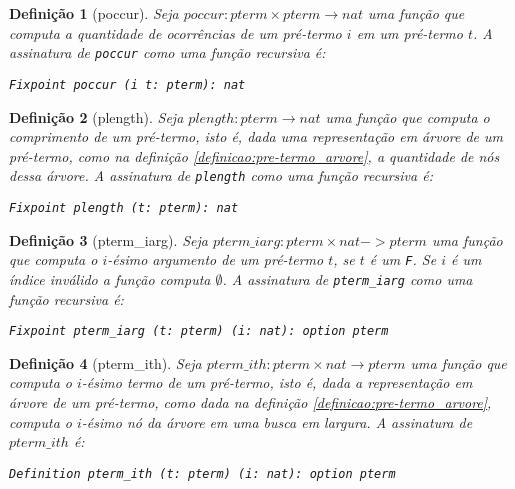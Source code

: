 \documentclass{article}
\newtheorem{definicao}{Definição}
\begin{document}
\begin{definicao}[poccur]
	Seja $poccur: pterm \times pterm \rightarrow nat$ uma função que computa a quantidade de ocorrências de um pré-termo $i$ em um pré-termo $t$. A assinatura de \texttt{poccur} como uma função recursiva é:

	\texttt{Fixpoint poccur (i t: pterm): nat}
	\label{definicao:poccur}
\end{definicao}

\begin{definicao}[plength]
	Seja $plength: pterm \rightarrow nat$ uma função que computa o comprimento de um pré-termo, isto é, dada uma representação em árvore de um pré-termo, como na definição \ref{definicao:pre-termo_arvore}, a quantidade de nós dessa árvore. A assinatura de \texttt{plength} como uma função recursiva é:

	\texttt{Fixpoint plength (t: pterm): nat}
	\label{definicao:plength}
\end{definicao}

\begin{definicao}[pterm\_iarg]
	Seja $pterm\_iarg: pterm \times nat -> pterm$ uma função que computa o $i$-ésimo argumento de um pré-termo $t$, se $t$ é um \texttt{F}. Se $i$ é um índice inválido a função computa $\emptyset$. A assinatura de \texttt{pterm\_iarg} como uma função recursiva é:

	\texttt{Fixpoint pterm\_iarg (t: pterm) (i: nat): option pterm}
	\label{definicao:pterm_iarg}
\end{definicao}

\begin{definicao}[pterm\_ith]
	Seja $pterm\_ith: pterm \times nat \rightarrow pterm$ uma função que computa o $i$-ésimo termo de um pré-termo, isto é, dada a representação em árvore de um pré-termo, como dada na definição \ref{definicao:pre-termo_arvore}, computa o $i$-ésimo nó da árvore em uma busca em largura. A assinatura de $pterm\_ith$ é: 

	\texttt{Definition pterm\_ith (t: pterm) (i: nat): option pterm}
	\label{definicao:pterm_ith}
\end{definicao}
\end{document}

